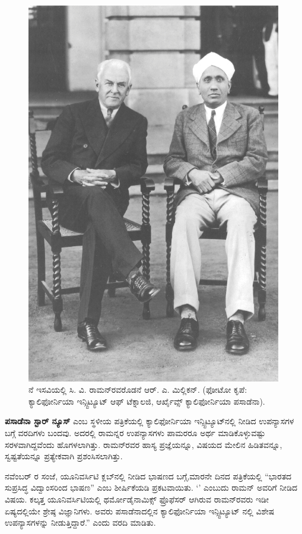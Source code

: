 \begin{figure}[!h]
\includegraphics[scale=0.29]{"images/4.jpg"}
\caption{ನೆ ಇಸವಿಯಲ್ಲಿ ಸಿ. ವಿ. ರಾಮನ್‍ರವರೊಡನೆ ಆರ್. ಎ. ಮಿಲ್ಲಿಕನ್. (ಫೋಟೋ ಕೃಪೆ: ಕ್ಯಾಲಿಫೋರ್ನಿಯಾ ಇನ್ಸ್ಟಿಟ್ಯೂಟ್ ಆಫ್ ಟೆಕ್ನಾಲಜಿ, ಆರ್ಖೈವ್ಸ್ ಕ್ಯಾಲಿಫೋರ್ನಿಯಾ ಪಸಾಡೆನಾ).}\label{chap1-fig05}
\end{figure}

\textbf{ಪಸಾಡೆನಾ ಸ್ಟಾರ್ ನ್ಯೂಸ್} ಎಂಬ ಸ್ಥಳೀಯ ಪತ್ರಿಕೆಯಲ್ಲಿ ಕ್ಯಾಲಿಫೋರ್ನಿಯಾ ಇನ್ಸ್ಟಿಟ್ಯೂಟ್‍ನಲ್ಲಿ ನೀಡಿದ ಉಪನ್ಯಾಸಗಳ ಬಗ್ಗೆ ವರದಿಗಳು ಬಂದವು. ಅದರಲ್ಲಿ ರಾಮನ್ನರ ಉಪನ್ಯಾಸಗಳು ಪಾಮರರೂ ಅರ್ಥ ಮಾಡಿಕೊಳ್ಳುವಷ್ಟು ಸರಳವಾಗಿದ್ದವೆಂದು ಹೊಗಳಲಾಗಿತ್ತು. ರಾಮನ್‍ರವರ ಹಾಸ್ಯ ಪ್ರಜ್ಞೆಯನ್ನೂ, ವಿಷಯದ ಮೇಲಿನ ಹಿಡಿತವನ್ನೂ, ಸ್ವಷ್ಟತೆಯನ್ನೂ ಪ್ರತ್ಯೇಕವಾಗಿ ಪ್ರಶಂಸಿಸಲಾಗಿತ್ತು.

 ನವೆಂಬರ್ ರ ಸಂಜೆ, ಯೂನಿವರ್ಸಿಟಿ ಕ್ಲಬ್‍ನಲ್ಲಿ ನೀಡಿದ ಭಾಷಣದ ಬಗ್ಗೆ,\break ಮಾರನೇ ದಿನದ ಪತ್ರಿಕೆಯಲ್ಲಿ “ಭಾರತದ ಸುಪ್ರಸಿದ್ಧ ವಿದ್ವಾಂಸರಿಂದ ಭಾಷಣ” ಎಂಬ ಶೀರ್ಷಿಕೆಯಡಿ ಪ್ರಕಟವಾಯಿತು. ‘\textit{}’ ಎಂಬುದು ರಾಮನ್ ಅವರಿಗೆ ನೀಡಿದ ವಿಷಯ. ಕಲ್ಕತ್ತ ಯೂನಿವರ್ಸಿಟಿಯಲ್ಲಿ ಥರ್ಮೋಡೈನಾಮಿಕ್ಸ್ ಫ್ರೊಫೆಸರ್ ಆಗಿರುವ ರಾಮನ್‍ರವರು ಇಡೀ ಏಷ್ಯದಲ್ಲಿಯೇ ಶ್ರೇಷ್ಠ ವಿಜ್ಞಾನಿಗಳು. ಅವರು ಪಸಾಡೆನಾದಲ್ಲಿನ ಕ್ಯಾಲಿಫೋರ್ನಿಯಾ ಇನ್ಸ್ಟಿಟ್ಯೂಟ್ ನಲ್ಲಿ ವಿಶೇಷ ಉಪನ್ಯಾಸಗಳನ್ನು ನೀಡುತ್ತಿದ್ದಾರೆ.” ಎಂದು ವರದಿ ಮಾಡಿತು.


